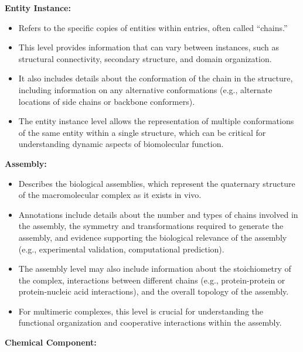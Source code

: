 \textbf{Entity Instance:}

\begin{itemize}
\tightlist
\item
  Refers to the specific copies of entities within entries, often called ``chains.''
\item
  This level provides information that can vary between instances, such as structural connectivity, secondary structure, and domain organization.
\item
  It also includes details about the conformation of the chain in the structure, including information on any alternative conformations (e.g., alternate locations of side chains or backbone conformers).
\item
  The entity instance level allows the representation of multiple conformations of the same entity within a single structure, which can be critical for understanding dynamic aspects of biomolecular function.
\end{itemize}

\textbf{Assembly:}

\begin{itemize}
\tightlist
\item
  Describes the biological assemblies, which represent the quaternary structure of the macromolecular complex as it exists in vivo.
\item
  Annotations include details about the number and types of chains involved in the assembly, the symmetry and transformations required to generate the assembly, and evidence supporting the biological relevance of the assembly (e.g., experimental validation, computational prediction).
\item
  The assembly level may also include information about the stoichiometry of the complex, interactions between different chains (e.g., protein-protein or protein-nucleic acid interactions), and the overall topology of the assembly.
\item
  For multimeric complexes, this level is crucial for understanding the functional organization and cooperative interactions within the assembly.
\end{itemize}

\textbf{Chemical Component:}

